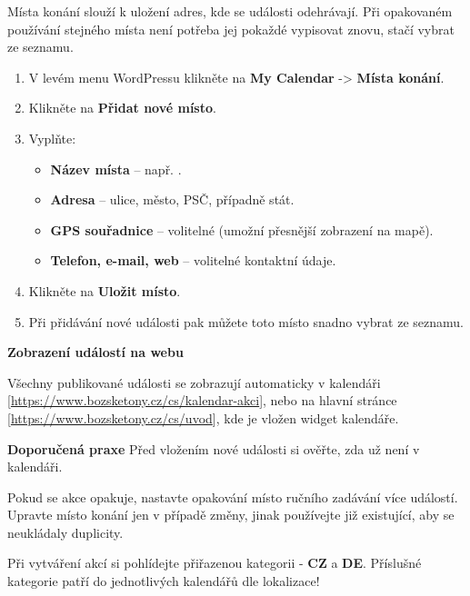 \documentclass[12pt,a4paper]{article}
\begin{document}
	
	Místa konání slouží k uložení adres, kde se události odehrávají. Při opakovaném používání stejného místa není potřeba jej pokaždé vypisovat znovu, stačí vybrat ze seznamu.
	
	\begin{enumerate}
		\item V levém menu WordPressu klikněte na \textbf{My Calendar} -> \textbf{Místa konání}.
		\item Klikněte na \textbf{Přidat nové místo}.
		\item Vyplňte:
		\begin{itemize}
			\item \textbf{Název místa} – např. .
			\item \textbf{Adresa} – ulice, město, PSČ, případně stát.
			\item \textbf{GPS souřadnice} – volitelné (umožní přesnější zobrazení na mapě).
			\item \textbf{Telefon, e-mail, web} – volitelné kontaktní údaje.
		\end{itemize}
		\item Klikněte na \textbf{Uložit místo}.
		\item Při přidávání nové události pak můžete toto místo snadno vybrat ze seznamu.
	\end{enumerate}
	
	\textbf{Zobrazení událostí na webu}
	
	Všechny publikované události se zobrazují automaticky v kalendáři [\url{https://www.bozsketony.cz/cs/kalendar-akci}], nebo na hlavní stránce [\url{https://www.bozsketony.cz/cs/uvod}], kde je vložen widget kalendáře.
	
	\newpage
	\textbf{Doporučená praxe}
	Před vložením nové události si ověřte, zda už není v kalendáři. 
	
	Pokud se akce opakuje, nastavte opakování místo ručního zadávání více událostí. Upravte místo konání jen v případě změny, jinak používejte již existující, aby se neukládaly duplicity.
	
	Při vytváření akcí si pohlídejte přiřazenou kategorii - \textbf{CZ} a \textbf{DE}. Příslušné kategorie patří do jednotlivých kalendářů dle lokalizace!
	
	
\end{document}
